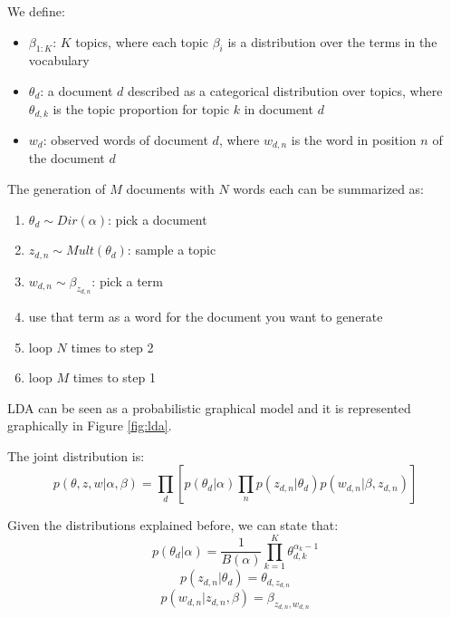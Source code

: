 We define:
\begin{itemize}
    \item $\beta_{1:K}$: $K$ topics, where each topic $\beta_i$ is a distribution over the terms in the vocabulary
    \item $\theta_d$: a document $d$ described as a categorical distribution over topics, where $\theta_{d,k}$ is the topic proportion for topic $k$ in document $d$
    \item $w_{d}$: observed words of document $d$, where $w_{d,n}$ is the word in position $n$ of the document $d$
\end{itemize}

The generation of $M$ documents with $N$ words each can be summarized as:
\begin{enumerate}
    \item $\theta_d \sim Dir(\alpha)$: pick a document
    \item $z_{d,n} \sim Mult(\theta_d)$: sample a topic
    \item $w_{d,n} \sim \beta_{z_{d,n}}$: pick a term
    \item use that term as a word for the document you want to generate
    \item loop $N$ times to step 2
    \item loop $M$ times to step 1
\end{enumerate}

LDA can be seen as a probabilistic graphical model and it is represented graphically in Figure \ref{fig:lda}.

The joint distribution is:
$$ p(\theta, z, w | \alpha, \beta) = \prod_d [p(\theta_d | \alpha) \prod_n p(z_{d,n} | \theta_d) p(w_{d, n} | \beta, z_{d,n})] $$

Given the distributions explained before, we can state that:
$$ p(\theta_d | \alpha) = \frac{1}{B(\alpha)} \prod_{k=1}^K \theta_{d,k}^{\alpha_k - 1}$$
$$ p(z_{d,n} | \theta_d) = \theta_{d, z_{d,n}} $$
$$ p(w_{d,n} | z_{d,n}, \beta) = \beta_{z_{d,n},w_{d,n}} $$


